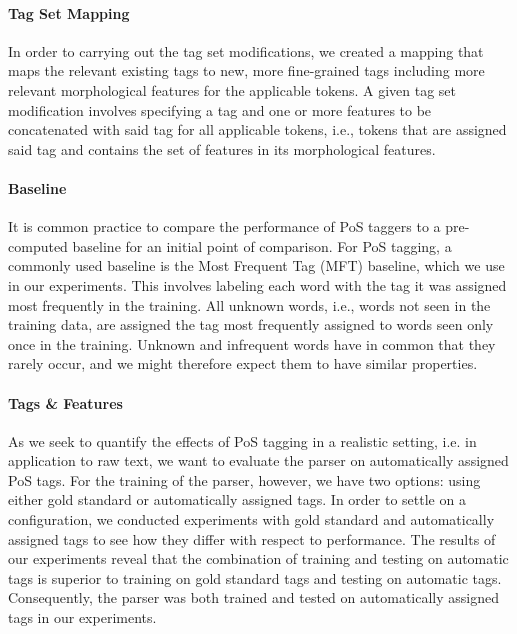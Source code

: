 \documentclass[11pt,a4paper]{article}
\begin{document}
\paragraph{Tag Set Mapping}
In order to carrying out the tag set modifications, we created a mapping that
maps the relevant existing tags to new, more fine-grained tags including more
relevant morphological features for the applicable tokens. A given tag set
modification involves specifying a tag and one or more features to be
concatenated with said tag for all applicable tokens, i.e., tokens that are
assigned said tag and contains the set of features in its morphological
features.

\paragraph{Baseline}
It is common practice to compare the performance of PoS taggers to a
pre-computed baseline for an initial point of comparison.
For PoS tagging, a commonly used baseline is the Most Frequent Tag (MFT)
baseline, which we use in our experiments. This involves labeling each word
with the tag it was assigned most frequently in the training. All unknown
words, i.e., words not seen in the training data, are assigned the tag most
frequently assigned to words seen only once in the training. Unknown and
infrequent words have in common that they rarely occur, and we might therefore
expect them to have similar properties.

\paragraph{Tags \& Features}
As we seek to quantify the effects of PoS tagging in a realistic
setting, i.e. in application to raw text, we want to evaluate the parser on
automatically assigned PoS tags. For the training of the parser,
however, we have two options: using either gold standard or
automatically assigned tags. In order to settle on a configuration, we
conducted experiments with gold standard and automatically assigned
tags to see how they differ with respect to performance. The results
of our experiments reveal that the combination of training and testing
on automatic tags is superior to training on gold standard tags and
testing on automatic tags.  Consequently, the parser was both trained
and tested on automatically assigned tags in our experiments.
\end{document}
